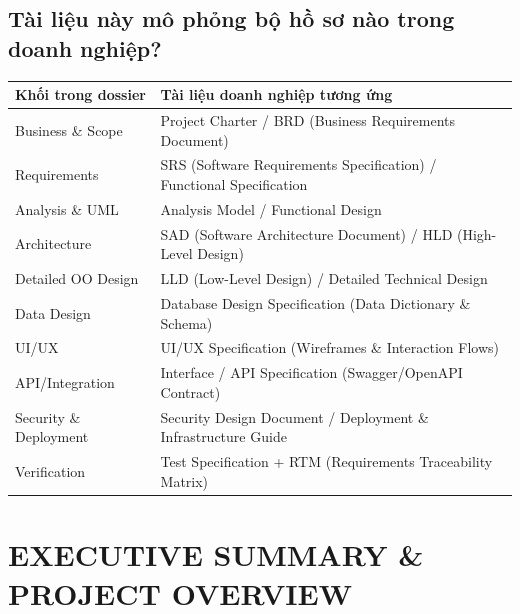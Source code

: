 \documentclass[11pt,a4paper]{article}
\begin{document}
\subsection{Tài liệu này mô phỏng bộ hồ sơ nào trong doanh nghiệp?}
\begin{table}[H]
    \centering
    \small
    \begin{tabularx}{\textwidth}{|l|X|}
        \hline
        \textbf{Khối trong dossier} & \textbf{Tài liệu doanh nghiệp tương ứng} \\ \hline
        Business \& Scope & Project Charter / BRD (Business Requirements Document) \\ \hline
        Requirements & SRS (Software Requirements Specification) / Functional Specification \\ \hline
        Analysis \& UML & Analysis Model / Functional Design \\ \hline
        Architecture & SAD (Software Architecture Document) / HLD (High-Level Design) \\ \hline
        Detailed OO Design & LLD (Low-Level Design) / Detailed Technical Design \\ \hline
        Data Design & Database Design Specification (Data Dictionary \& Schema) \\ \hline
        UI/UX & UI/UX Specification (Wireframes \& Interaction Flows) \\ \hline
        API/Integration & Interface / API Specification (Swagger/OpenAPI Contract) \\ \hline
        Security \& Deployment & Security Design Document / Deployment \& Infrastructure Guide \\ \hline
        Verification & Test Specification + RTM (Requirements Traceability Matrix) \\ \hline
    \end{tabularx}
\end{table}

\section{EXECUTIVE SUMMARY \& PROJECT OVERVIEW}
\end{document}
